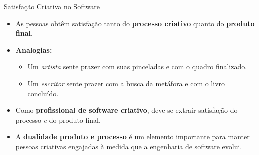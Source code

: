 \documentclass[9pt]{beamer}
\begin{document}
\begin{frame}{Satisfação Criativa no Software}
  \begin{itemize}
    \item As pessoas obtêm satisfação tanto do \textbf{processo criativo} quanto do \textbf{produto final}.
    \item \textbf{Analogias:}
      \begin{itemize}
        \item Um \textit{artista} sente prazer com suas pinceladas e com o quadro finalizado.
        \item Um \textit{escritor} sente prazer com a busca da metáfora e com o livro concluído.
      \end{itemize}
    \item Como \textbf{profissional de software criativo}, deve-se extrair satisfação do processo \textit{e} do produto final.
    \item A \textbf{dualidade produto e processo} é um elemento importante para manter pessoas criativas engajadas à medida que a engenharia de software evolui.
  \end{itemize}
\end{frame}
\end{document}
